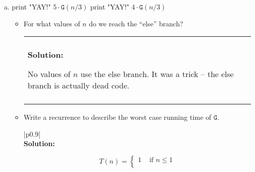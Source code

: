 \documentclass[12pt]{article}
\newenvironment{solution}
	{\begin{center}
	\begin{tabular}{|p{0.9\textwidth}|}
	\hline\\
	\textbf{Solution:}
	}
	{\\\\
	\hline
	\end{tabular}
	\end{center}
	}
\begin{document}
\begin{enumerate}[a)]
\begin{algorithm}
\begin{algorithmic}
		\State \texttt{result} $\gets 0$
				\State \texttt{result} $\gets$ \texttt{result} $+ j$
			\EndFor
		\EndFor
		\State \Return \texttt{F}($n/2$) + \texttt{result} + \texttt{F}($n/2)$
		\EndFunction
\end{algorithmic}
\end{algorithm}
\begin{itemize}
	\item Write a recurrence to model the running time of this function.
	\begin{solution}
		\[ T(n) = \begin{cases} c_1 &\text{ if }n=0\\
								2T(n/2) + c_2n^2 &\text{ otherwise}
								\end{cases}\]
		Where $c_1, c_2$ are constants.
	\end{solution}
	\item Find a Big-$\Theta$ bound on the running time. 
	\begin{solution}
		Applying the master theorem, since $\log_2(2) < 2$ is $\Theta(n^2)$. We could also solve the recurrence with the tree method to get this bound.
	\end{solution}
\end{itemize}
\newpage
\item \begin{algorithm}
\begin{algorithmic}
			\State {}
		\EndIf
				\State print "YAY!"
			\EndFor
			\State \Return $5 \cdot \texttt{G}(n/3)$
		\Else
				\State print "YAY!"
			\EndFor
			\State \Return $4\cdot \texttt{G}(n/3)$ 
		\EndIf
		\EndFunction
\end{algorithmic}
\end{algorithm}
\begin{itemize}
	\item For what values of $n$ do we reach the ``else'' branch?
	\begin{solution}
		No values of $n$ use the else branch. It was a trick -- the else branch is actually dead code.
	\end{solution}
	\item Write a recurrence to describe the worst case running time of $\texttt{G}$. 
	\begin{solution}
		\[ T(n) = \begin{cases}
				1 &\text{ if } n \leq 1\\

\end{cases}\]
\end{solution}
\end{itemize}
\end{enumerate}
\end{document}
